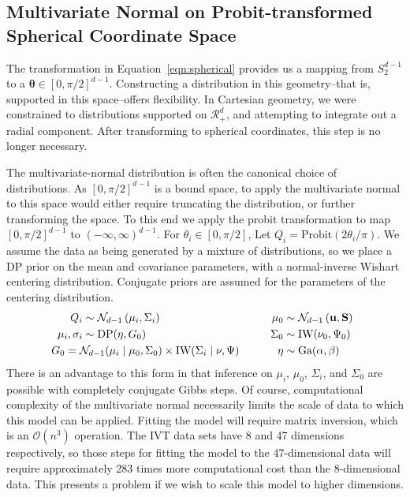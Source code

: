
\subsection{Multivariate Normal on Probit-transformed Spherical Coordinate Space}
\label{method:npprobitnorm}
The transformation in Equation~\ref{eqn:spherical} provides us a mapping from $S_{2}^{d-1}$ to a
  $\bm{\theta} \in [0, \pi/2]^{d-1}$.  Constructing a distribution in this geometry--that is, supported
  in this space--offers flexibility.  In Cartesian geometry, we were constrained to distributions supported
  on $\mathcal{R}_+^{d}$, and attempting to integrate out a radial component.  After transforming to
  spherical coordinates, this step is no longer necessary.

The multivariate-normal distribution is often the canonical choice of distributions.  As $[0,\pi/2]^{d-1}$
  is a bound space, to apply the multivariate normal to this space would either require truncating the
  distribution, or further transforming the space.  To this end we apply the probit transformation to
  map $[0,\pi/2]^{d-1}$ to $(-\infty,\infty)^{d-1}$.  For $\theta_i \in [0,\pi/2]$,
  Let $Q_i = \text{Probit}(2\theta_i / \pi)$.  We assume the data as being generated by a mixture of distributions,
  so we place a DP prior on the mean and covariance parameters, with a normal-inverse Wishart centering
  distribution.  Conjugate priors are assumed for the parameters of the centering distribution.
  \begin{equation}
    \begin{aligned}
                Q_i &\sim \mathcal{N}_{d-1}\left(\mu_i, \Sigma_i\right)\\
    \mu_i, \sigma_i &\sim \text{DP}(\eta, G_0)\\
                    &\hspace{-1cm}G_0 =
                      \mathcal{N}_{d-1}(\mu_i\mid\mu_0,\Sigma_0)\times \text{IW}(\Sigma_i\mid\nu,\Psi)
    \end{aligned}
    \hspace{1cm}
    \begin{aligned}
              \mu_0 &\sim \mathcal{N}_{d-1}\left({\bf u},{\bf S}\right)\\
           \Sigma_0 &\sim \text{IW}(\nu_0,\Psi_0)\\
               \eta &\sim \text{Ga}(\alpha, \beta)
    \end{aligned}
  \end{equation}
  There is an advantage to this form in that inference on $\mu_i$, $\mu_0$, $\Sigma_i$, and $\Sigma_0$
  are possible with completely conjugate Gibbs steps.  Of course, computational complexity of the
  multivariate normal necessarily limits the scale of data to which this model can be applied.  Fitting
  the model will require matrix inversion, which is an $\mathcal{O}(n^3)$ operation.
  The IVT data sets have 8 and 47 dimensions respectively, so those steps for fitting the model to
  the 47-dimensional data will require approximately 283 times more computational cost than the 
  8-dimensional data. This presents a problem if we wish to scale this model to higher dimensions.

